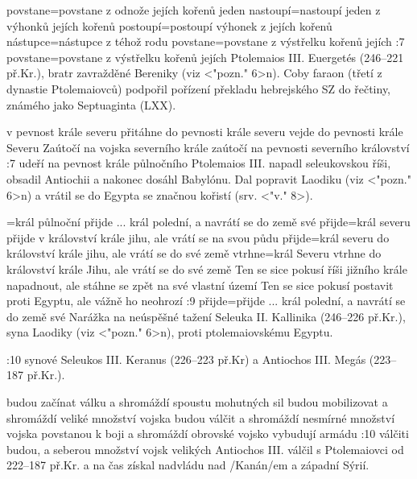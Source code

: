     {povstane}={povstane z odnože jejích kořenů jeden}   %
    {nastoupí}={nastoupí jeden z výhonků jejích kořenů}   %
    {postoupí}={postoupí výhonek z jejích kořenů}   %
    {nástupce}={nástupce z téhož rodu}   %
    {povstane}={povstane z výstřelku kořenů jejích}   %
:7 {povstane}={povstane z výstřelku kořenů jejích}  Ptolemaios  III. Euergetés (246--221         př.Kr.), bratr zavražděné Bereniky (viz <"pozn." 6>n). Coby faraon (třetí z dynastie     Ptolemaiovců) podpořil pořízení překladu hebrejského SZ do řečtiny, známého jako Septuaginta (LXX). 


    {v pevnost krále severu}   %
    {přitáhne do pevnosti krále severu}   %
    {vejde do pevnosti krále Severu}   %
    {Zaútočí na vojska severního krále}   %
    {zaútočí na pevnosti severního království}   %
:7 {udeří na pevnost krále půlnočního}  
    Ptolemaios III. napadl seleukovskou říši, obsadil Antiochii a nakonec dosáhl Babylónu. Dal popravit Laodiku (viz <"pozn." 6>n) a vrátil se do Egypta se značnou kořistí (srv. <"v." 8>).


={král půlnoční přijde ... král polední, a navrátí se do země své}   %
    {přijde}={král severu přijde v království krále jihu, ale vrátí se na svou půdu}   %
    {přijde}={král severu do království krále jihu, ale vrátí se do své země}   %
    {vtrhne}={král Severu vtrhne do království krále Jihu, ale vrátí se do své země}   %
    {Ten se sice pokusí říši jižního krále napadnout, ale stáhne se zpět na své vlastní území}  %
    {Ten se sice pokusí postavit proti Egyptu, ale vážně ho neohrozí}  %
:9 {přijde}={přijde ... král polední, a navrátí se do země své}  
    Narážka na neúspěšné tažení Seleuka II. Kallinika (246--226 př.Kr.), syna Laodiky (viz <"pozn." 6>n), proti ptolemaiovskému Egyptu.


:10 {synové} Seleukos III. Keranus (226--223 př.Kr) a Antiochos III. Megás (223--187 př.Kr.).

    {budou začínat válku a shromáždí spoustu mohutných sil}   %
    {budou mobilizovat a shromáždí veliké množství vojska}   %
    {budou válčit a shromáždí nesmírné množství vojska}   %
    {povstanou k boji a shromáždí obrovské vojsko}   %
    {vybudují armádu}   %
:10 {válčiti budou, a seberou množství vojsk velikých}
    Antiochos III. válčil s Ptolemaiovci od 222--187 př.Kr. a na čas získal nadvládu nad \x/Kanán/em a západní Sýrií. 

